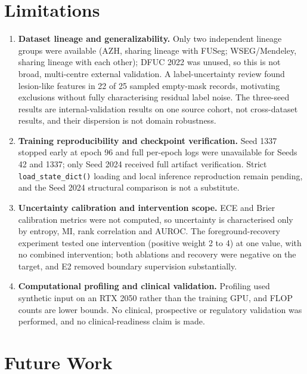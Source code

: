 \documentclass[conference]{IEEEtran}
\begin{document}
\section{Limitations}
\label{sec:limitations}

\begin{enumerate}
\item \textbf{Dataset lineage and generalizability.} Only two independent lineage groups were available (AZH, sharing lineage with FUSeg; WSEG/Mendeley, sharing lineage with each other); DFUC 2022 was unused, so this is not broad, multi-centre external validation. A label-uncertainty review found lesion-like features in 22 of 25 sampled empty-mask records, motivating exclusions without fully characterising residual label noise. The three-seed results are internal-validation results on one source cohort, not cross-dataset results, and their dispersion is not domain robustness.
\item \textbf{Training reproducibility and checkpoint verification.} Seed 1337 stopped early at epoch 96 and full per-epoch logs were unavailable for Seeds 42 and 1337; only Seed 2024 received full artifact verification. Strict \texttt{load\_state\_dict()} loading and local inference reproduction remain pending, and the Seed 2024 structural comparison is not a substitute.
\item \textbf{Uncertainty calibration and intervention scope.} ECE and Brier calibration metrics were not computed, so uncertainty is characterised only by entropy, MI, rank correlation and AUROC. The foreground-recovery experiment tested one intervention (positive weight 2 to 4) at one value, with no combined intervention; both ablations and recovery were negative on the target, and E2 removed boundary supervision substantially.
\item \textbf{Computational profiling and clinical validation.} Profiling used synthetic input on an RTX 2050 rather than the training GPU, and FLOP counts are lower bounds. No clinical, prospective or regulatory validation was performed, and no clinical-readiness claim is made.
\end{enumerate}

\section{Future Work}
\label{sec:future}
\end{document}
